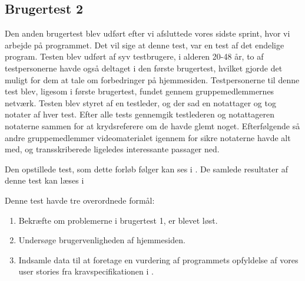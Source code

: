 \subsection{Brugertest 2}
Den anden brugertest blev udført efter vi afsluttede vores sidste sprint, hvor vi arbejde på programmet.
Det vil sige at denne test, var en test af det endelige program.
Testen blev udført af syv testbrugere, i alderen 20-48 år, to af testpersonerne havde også deltaget i den første brugertest, hvilket gjorde det muligt for dem at tale om forbedringer på hjemmesiden.
Testpersonerne til denne test blev, ligesom i første brugertest, fundet gennem gruppemedlemmernes netværk.
Testen blev styret af en testleder, og der sad en notattager og tog notater af hver test.
Efter alle tests gennemgik testlederen og notattageren notaterne sammen for at krydsreferere om de havde glemt noget.
Efterfølgende så andre gruppemedlemmer videomaterialet igennem for sikre notaterne havde alt med, og transskriberede ligeledes interessante passager ned.

Den opstillede test, som dette forløb følger kan ses i .
De samlede resultater af denne test kan læses i  

Denne test havde tre overordnede formål:
\begin{enumerate}
   \item Bekræfte om problemerne i brugertest 1, er blevet løst. 
   \item Undersøge brugervenligheden af hjemmesiden.
   \item Indsamle data til at foretage en vurdering af programmets opfyldelse af vores user stories fra kravspecifikationen i . 

\end{enumerate}

